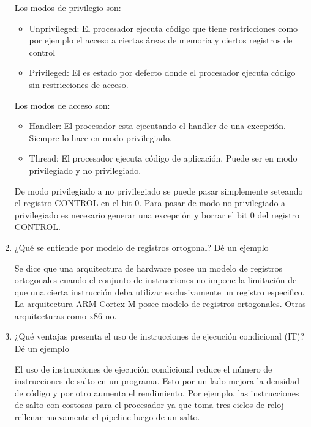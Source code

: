 \documentclass[12pt, a4paper]{article}
\makeatletter
\newcommand\setItemnumber[1]{\setcounter{enum\romannumeral\@enumdepth}{\numexpr#1-1\relax}}
\makeatother
\begin{document}
\begin{enumerate}
    Los modos de privilegio son:
    
      \begin{itemize}
        \item Unprivileged: El procesador ejecuta código que tiene restricciones como por ejemplo
        el acceso a ciertas áreas de memoria y ciertos registros de control
        \item Privileged: El es estado por defecto donde el procesador ejecuta código sin restricciones de 
        acceso.
    \end{itemize}
    
    Los modos de acceso son:
    
    \begin{itemize}
        \item Handler: El procesador esta ejecutando el handler de una excepción. Siempre
        lo hace en modo privilegiado.
        \item Thread: El procesador ejecuta código de aplicación. Puede ser en modo 
        privilegiado y no privilegiado.
    \end{itemize}
    
    De modo privilegiado a no privilegiado se puede pasar simplemente seteando el registro CONTROL en el 
    bit 0. Para pasar de modo no privilegiado a privilegiado es necesario generar una excepción y borrar 
    el bit 0 del registro CONTROL.

    \setItemnumber{7}
    \item ¿Qué se entiende por modelo de registros ortogonal? Dé un ejemplo
    
    Se dice que una arquitectura de hardware posee un modelo de registros ortogonales 
    cuando el conjunto de instrucciones no impone la limitación de que una cierta instrucción
    deba utilizar exclusivamente un registro especifico. La arquitectura ARM Cortex M posee
    modelo de registros ortogonales. Otras arquitecturas como x86 no.
    
    
    \setItemnumber{8}
    \item ¿Qué ventajas presenta el uso de instrucciones de ejecución condicional (IT)? Dé un
    ejemplo
    
    El uso de instrucciones de ejecución condicional reduce el número de instrucciones de salto
    en un programa. Esto por un lado mejora la densidad de código y por otro aumenta el rendimiento.
    Por ejemplo, las instrucciones de salto con costosas para el procesador ya que toma tres ciclos de 
    reloj rellenar nuevamente el pipeline luego de un salto. 


\end{enumerate}
\end{document}
